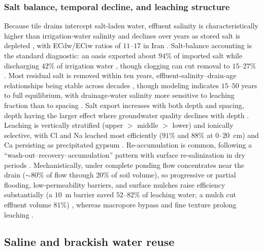 \subsubsection{Salt balance, temporal decline, and leaching structure}

Because tile drains intercept salt-laden water, effluent salinity is
characteristically higher than irrigation-water salinity and declines over years
as stored salt is depleted \parencite{Li2022,Karegoudar2022}, with ECdw/ECiw
ratios of $11$--$17$ in Iran \parencite{Akram2013}. Salt-balance accounting is
the standard diagnostic: an oasis exported about $94\%$ of imported salt while
discharging $42\%$ of irrigation water \parencite{Askri2022}, though clogging can
cut removal to $15$--$27\%$ \parencite{BenAissa2013,HajAmor2019}. Most residual
salt is removed within ten years, effluent-salinity--drain-age relationships
being stable across decades \parencite{JOHNSTON1993}, though modeling indicates
$15$--$50$ years to full equilibrium, with drainage-water salinity more sensitive
to leaching fraction than to spacing \parencite{Kelleners2000}. Salt export
increases with both depth and spacing, depth having the larger effect where
groundwater quality declines with depth \parencite{GRISMER1993,KAMRA1991,KAMRA1994}.
Leaching is vertically stratified (upper $>$ middle $>$ lower) and ionically
selective, with Cl and Na leached most efficiently ($91\%$ and $88\%$ at
$0$--$20$~cm) and Ca persisting as precipitated gypsum
\parencite{Chen2022,Qian2025,Yu2016}. Re-accumulation is common, following a
``wash-out--recovery--accumulation'' pattern with surface re-salinization in dry
periods \parencite{Zhu2025b,Dou2022,Shi2021b}. Mechanistically, under complete
ponding flow concentrates near the drain ($\sim80\%$ of flow through $20\%$ of
soil volume), so progressive or partial flooding, low-permeability barriers, and
surface mulches raise efficiency substantially (a $10$~m barrier saved
$52$--$82\%$ of leaching water; a mulch cut effluent volume $81\%$)
\parencite{RAO1991,Youngs2000,Yu2018,Zhang2022}, whereas macropore bypass and
fine texture prolong leaching \parencite{Xin2016,MANN1982}.

\subsection{Saline and brackish water reuse}

